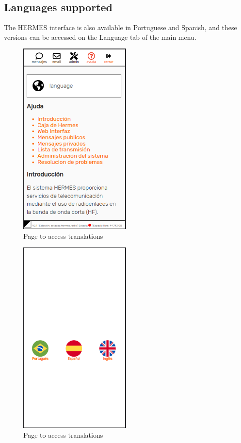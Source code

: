 \documentclass[11pt,a4paper]{article}
\begin{document}
\subsection{Languages supported}
\label{langs}

The HERMES interface is also available in Portuguese and Spanish, and these versions can be accessed on the Language tab of the main menu.

\begin{figure}[H]
    \centering
    \includegraphics[width=0.5\textwidth]{screenshots/frontend/es/languages.png}
    \caption{Page to access translations}
	\vspace{-10pt}
    \label{fig:languages}
\end{figure}

\begin{figure}[H]
    \centering
    \includegraphics[width=0.5\textwidth]{screenshots/frontend/es/languages2.png}
    \caption{Page to access translations}
	\vspace{-10pt}
    \label{fig:languages2}
\end{figure}
\end{document}
